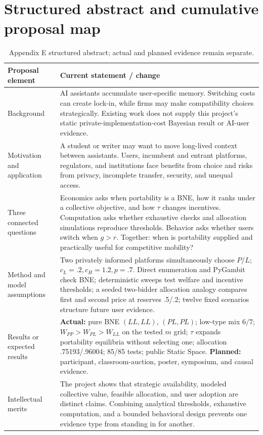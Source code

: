 \section{Structured abstract and cumulative proposal map}\label{app:abstract}
\begin{table}[H]
\caption{Appendix E structured abstract; actual and planned evidence remain separate.}
\label{tab:abstract-map}
\renewcommand{\arraystretch}{1.18}
\begin{tabularx}{\textwidth}{@{}p{}Y@{}}
\toprule
\textbf{Proposal element} & \textbf{Current statement / change} \\
\midrule
Background & AI assistants accumulate user-specific memory. Switching costs can create lock-in, while firms may make compatibility choices strategically. Existing work does not supply this project's static private-implementation-cost Bayesian result or AI-user evidence. \\
Motivation and application & A student or writer may want to move long-lived context between assistants. Users, incumbent and entrant platforms, regulators, and institutions face benefits from choice and risks from privacy, incomplete transfer, security, and unequal access. \\
Three connected questions & Economics asks when portability is a BNE, how it ranks under a collective objective, and how $\tau$ changes incentives. Computation asks whether exhaustive checks and allocation simulations reproduce thresholds. Behavior asks whether users switch when $g>r$. Together: when is portability supplied and practically useful for competitive mobility? \\
Method and model assumptions & Two privately informed platforms simultaneously choose $P/L$; $c_L=.2,c_H=1.2,p=.7$. Direct enumeration and PyGambit check BNE; deterministic sweeps test welfare and incentive thresholds; a seeded two-bidder allocation analogy compares first and second price at reserves .5/.2; twelve fixed scenarios structure future user evidence. \\
Results or expected results & \textbf{Actual:} pure BNE $(LL,LL)$, $(PL,PL)$; low-type mix $6/7$; $W_{PP}>W_{PL}>W_{LL}$ on the tested $m$ grid; $\tau$ expands portability equilibria without selecting one; allocation .75193/.96004; 85/85 tests; public Static Space. \textbf{Planned:} participant, classroom-auction, poster, symposium, and causal evidence. \\
Intellectual merits & The project shows that strategic availability, modeled collective value, feasible allocation, and user adoption are distinct claims. Combining analytical thresholds, exhaustive computation, and a bounded behavioral design prevents one evidence type from standing in for another. \\

\end{tabularx}
\end{table}
